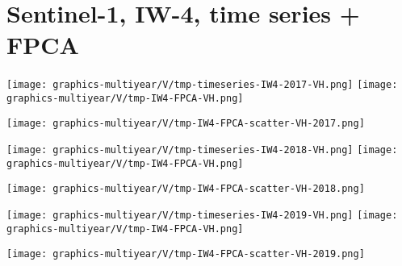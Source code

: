 
\section{Sentinel-1, IW-4, time series + FPCA}
\setcounter{theorem}{0}

\renewcommand{\theenumi}{\roman{enumi}}
\renewcommand{\labelenumi}{\textnormal{(\theenumi)}$\;\;$}


\begin{center}
\begin{minipage}{7.0in}
\texttt{[image: graphics-multiyear/V/tmp-timeseries-IW4-2017-VH.png]}
\quad
\texttt{[image: graphics-multiyear/V/tmp-IW4-FPCA-VH.png]}
\vskip 1.0cm
\begin{center}
\texttt{[image: graphics-multiyear/V/tmp-IW4-FPCA-scatter-VH-2017.png]}
\end{center}
\end{minipage}
\end{center}


\begin{center}
\begin{minipage}{7.0in}
\texttt{[image: graphics-multiyear/V/tmp-timeseries-IW4-2018-VH.png]}
\quad
\texttt{[image: graphics-multiyear/V/tmp-IW4-FPCA-VH.png]}
\vskip 1.0cm
\begin{center}
\texttt{[image: graphics-multiyear/V/tmp-IW4-FPCA-scatter-VH-2018.png]}
\end{center}
\end{minipage}
\end{center}


\begin{center}
\begin{minipage}{7.0in}
\texttt{[image: graphics-multiyear/V/tmp-timeseries-IW4-2019-VH.png]}
\quad
\texttt{[image: graphics-multiyear/V/tmp-IW4-FPCA-VH.png]}
\vskip 1.0cm
\begin{center}
\texttt{[image: graphics-multiyear/V/tmp-IW4-FPCA-scatter-VH-2019.png]}
\end{center}
\end{minipage}
\end{center}

